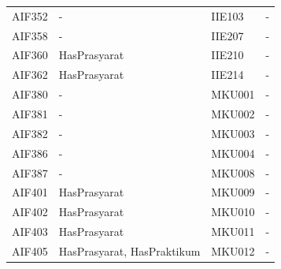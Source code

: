 \begin{enumerate}
\begin{table}[H]
\begin{tabular}{|p{2.125cm}|p{4.9cm}|p{2.125cm}|p{4.9cm}|}
    AIF352  & -                          &  IIE103    & -		     \\
    AIF358  & -                          &	IIE207    & -   			\\
    AIF360  & HasPrasyarat               &  IIE210    & -				\\
    AIF362  & HasPrasyarat               &	IIE214    &	-   			\\
    AIF380  & -                          &	MKU001	  & -     			\\
    AIF381  & -                          &	MKU002	  & -      			\\
    AIF382  & -                          &	MKU003	  & -     			\\
    AIF386  & -                          &	MKU004    & -     			\\
    AIF387  & -                          &	MKU008	  & -    			\\
    AIF401  & HasPrasyarat               &	MKU009    &	-				\\
    AIF402  & HasPrasyarat               &	MKU010	  &	-				\\
    AIF403  & HasPrasyarat               &	MKU011	  & -				\\
    AIF405  & HasPrasyarat, HasPraktikum &	MKU012	  &	-				\\
		\hline
    \end{tabular}
		

\end{table}
\end{enumerate}
